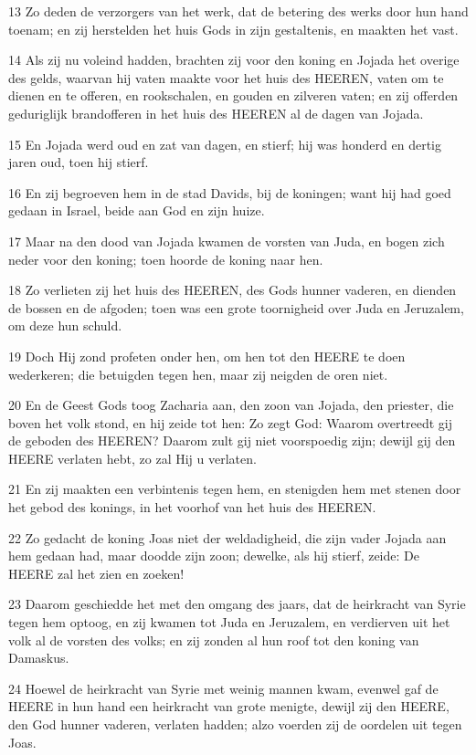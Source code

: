 \par 13 Zo deden de verzorgers van het werk, dat de betering des werks door hun hand toenam; en zij herstelden het huis Gods in zijn gestaltenis, en maakten het vast.
\par 14 Als zij nu voleind hadden, brachten zij voor den koning en Jojada het overige des gelds, waarvan hij vaten maakte voor het huis des HEEREN, vaten om te dienen en te offeren, en rookschalen, en gouden en zilveren vaten; en zij offerden geduriglijk brandofferen in het huis des HEEREN al de dagen van Jojada.
\par 15 En Jojada werd oud en zat van dagen, en stierf; hij was honderd en dertig jaren oud, toen hij stierf.
\par 16 En zij begroeven hem in de stad Davids, bij de koningen; want hij had goed gedaan in Israel, beide aan God en zijn huize.
\par 17 Maar na den dood van Jojada kwamen de vorsten van Juda, en bogen zich neder voor den koning; toen hoorde de koning naar hen.
\par 18 Zo verlieten zij het huis des HEEREN, des Gods hunner vaderen, en dienden de bossen en de afgoden; toen was een grote toornigheid over Juda en Jeruzalem, om deze hun schuld.
\par 19 Doch Hij zond profeten onder hen, om hen tot den HEERE te doen wederkeren; die betuigden tegen hen, maar zij neigden de oren niet.
\par 20 En de Geest Gods toog Zacharia aan, den zoon van Jojada, den priester, die boven het volk stond, en hij zeide tot hen: Zo zegt God: Waarom overtreedt gij de geboden des HEEREN? Daarom zult gij niet voorspoedig zijn; dewijl gij den HEERE verlaten hebt, zo zal Hij u verlaten.
\par 21 En zij maakten een verbintenis tegen hem, en stenigden hem met stenen door het gebod des konings, in het voorhof van het huis des HEEREN.
\par 22 Zo gedacht de koning Joas niet der weldadigheid, die zijn vader Jojada aan hem gedaan had, maar doodde zijn zoon; dewelke, als hij stierf, zeide: De HEERE zal het zien en zoeken!
\par 23 Daarom geschiedde het met den omgang des jaars, dat de heirkracht van Syrie tegen hem optoog, en zij kwamen tot Juda en Jeruzalem, en verdierven uit het volk al de vorsten des volks; en zij zonden al hun roof tot den koning van Damaskus.
\par 24 Hoewel de heirkracht van Syrie met weinig mannen kwam, evenwel gaf de HEERE in hun hand een heirkracht van grote menigte, dewijl zij den HEERE, den God hunner vaderen, verlaten hadden; alzo voerden zij de oordelen uit tegen Joas.
